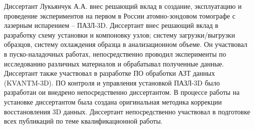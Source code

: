 {\contribution} Диссертант Лукьянчук А.А. внес решающий вклад в создание, эксплуатацию и проведение экспериментов на первом в России атомно-зондовом томографе с лазерным испарением – ПАЗЛ-3D. Диссертант внес решающий вклад в разработку схему установки и компоновку узлов; систему загрузки/выгрузки образцов, систему охлаждения образца в анализационном объеме. Он участвовал в  пуско-наладочных работах, непосредственно проводил эксперименты по исследованию различных материалов и обрабатывал полученные данные. Диссертант также участвовал в разработке ПО обработки АЗТ данных (KVANTM-3D). ПО контроля и управления установкой ПАЗЛ-3D было разработан ои внедрено непосредственно диссертантом. В процессе работы на установке диссертантом была создана оригинальная методика коррекции восстановления 3D данных. Диссертант непосредственно участвовал в подготовке всех публикаций по теме квалификационной работы.










